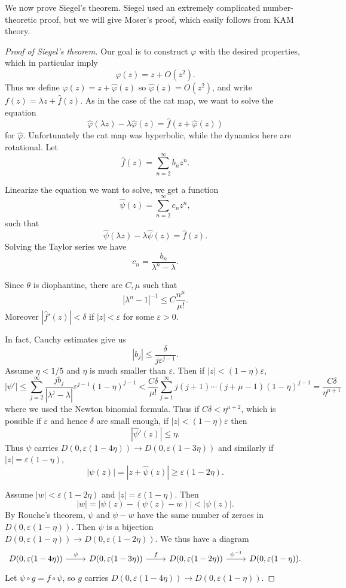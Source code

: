 \documentclass[12pt]{report}
\theoremstyle{definition}
\begin{document}
We now prove Siegel's theorem. Siegel used an extremely complicated number-theoretic proof, but we will give Moser's proof, which easily follows from KAM theory.
\begin{proof}[Proof of Siegel's theorem]
Our goal is to construct $\varphi$ with the desired properties, which in particular imply
$$\varphi(z) = z + O(z^2).$$
Thus we define $\varphi(z) = z + \hat \varphi(z)$ so $\hat \varphi(z) = O(z^2)$, and write $f(z) = \lambda z + \hat f(z)$.
As in the case of the cat map, we want to solve the equation
$$\hat \varphi(\lambda z) - \lambda \hat \varphi(z) = \hat f(z + \hat \varphi(z))$$
for $\hat \varphi$.
Unfortunately the cat map was hyperbolic, while the dynamics here are rotational.
Let
$$\hat f(z) = \sum_{n=2}^\infty b_nz^n.$$

Linearize the equation we want to solve, we get a function
$$\hat \psi(z) = \sum_{n=2}^\infty c_nz^n,$$
such that
$$\hat \psi(\lambda z) - \lambda \hat \psi(z) = \hat f(z).$$
Solving the Taylor series we have
$$c_n = \frac{b_n}{\lambda^n - \lambda}.$$

Since $\theta$ is diophantine, there are $C,\mu$ such that
$$|\lambda^n - 1|^{-1} \leq C\frac{n^\mu}{\mu!}.$$
Moreover $|\hat f'(z)| < \delta$ if $|z| < \varepsilon$ for some $\varepsilon > 0$.

In fact, Cauchy estimates give us
$$|b_j| \leq \frac{\delta}{j\varepsilon^{j-1}}.$$
Assume $\eta < 1/5$ and $\eta$ is much smaller than $\varepsilon$. Then if $|z| < (1 - \eta)\varepsilon$,
$$|\psi'| \leq \sum_{j=2}^\infty \frac{jb_j}{|\lambda^j - \lambda|}\varepsilon^{j-1}(1 - \eta)^{j-1} < \frac{C\delta}{\mu!} \sum_{j=1}^\infty j(j+1)\cdots(j + \mu - 1)(1 - \eta)^{j-1} = \frac{C\delta}{\eta^{\mu + 1}}$$
where we used the Newton binomial formula.
Thus if $C\delta < \eta^{\mu + 2}$, which is possible if $\varepsilon$ and hence $\delta$ are small enough, if $|z| < (1 - \eta)\varepsilon$ then
$$|\hat \psi'(z)| \leq \eta.$$
Thus $\psi$ carries $D(0, \varepsilon(1 - 4\eta))\to D(0, \varepsilon(1-3\eta))$ and similarly if $|z| = \varepsilon(1 - \eta)$,
$$|\psi(z)| = |z + \hat \psi(z)| \geq \varepsilon(1 - 2\eta).$$

Assume $|w| < \varepsilon(1 - 2\eta)$ and $|z| = \varepsilon(1 - \eta)$. Then
$$|w| = |\psi(z)-(\psi(z) - w)| < |\psi(z)|.$$
By Rouche's theorem, $\psi$ and $\psi - w$ have the same number of zeroes in $D(0, \varepsilon(1 - \eta))$.
Then $\psi$ is a bijection $D(0, \varepsilon(1 - \eta)) \to D(0, \varepsilon(1 - 2\eta))$.
We thus have a diagram
$$\begin{tikzcd}
D(0, \varepsilon(1 - 4\eta)) \arrow[r,"\psi"] & D(0, \varepsilon(1-3\eta)) \arrow[r,"f"] & D(0, \varepsilon(1 - 2\eta)) \arrow[r, "\psi^{-1}"] & D(0, \varepsilon(1 - \eta)).
\end{tikzcd}$$
Let $\psi \circ g = f \circ \psi$, so $g$ carries $D(0, \varepsilon(1 - 4\eta)) \to D(0, \varepsilon(1 - \eta))$.


\end{proof}
\end{document}
